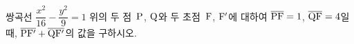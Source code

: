 쌍곡선 $\dfrac{x^2}{16}-\dfrac{y^2}{9}=1$ 위의 두 점~$\mathrm{P}$, $\mathrm{Q}$와 두 초점~$\mathrm{F}$, $\mathrm{F'}$에 대하여 $\overline{\mathrm{PF}}=1$, $\overline{\mathrm{QF}}=4$일 때, $\overline{\mathrm{PF'}}+\overline{\mathrm{QF'}}$의 값을 구하시오.
